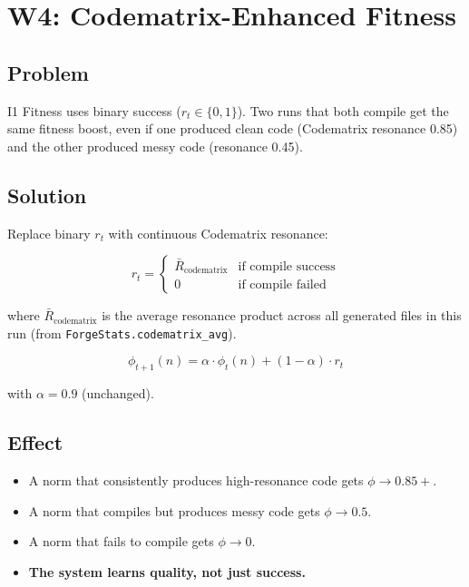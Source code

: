 \documentclass[11pt,a4paper]{article}
\begin{document}
\section{W4: Codematrix-Enhanced Fitness}
\label{sec:w4}

\subsection{Problem}

I1 Fitness uses binary success ($r_t \in \{0, 1\}$). Two runs 
that both compile get the same fitness boost, even if one 
produced clean code (Codematrix resonance 0.85) and the other 
produced messy code (resonance 0.45).

\subsection{Solution}

Replace binary $r_t$ with continuous Codematrix resonance:

\begin{equation}
r_t = \begin{cases}
\bar{R}_\text{codematrix} & \text{if compile success} \\
0 & \text{if compile failed}
\end{cases}
\end{equation}

where $\bar{R}_\text{codematrix}$ is the average resonance 
product across all generated files in this run 
(from \texttt{ForgeStats.codematrix\_avg}).

\begin{equation}
\phi_{t+1}(n) = \alpha \cdot \phi_t(n) + (1 - \alpha) \cdot r_t
\end{equation}

with $\alpha = 0.9$ (unchanged).

\subsection{Effect}

\begin{itemize}[nosep]
\item A norm that consistently produces high-resonance code 
      gets $\phi \to 0.85+$.
\item A norm that compiles but produces messy code gets 
      $\phi \to 0.5$.
\item A norm that fails to compile gets $\phi \to 0$.
\item \textbf{The system learns quality, not just success.}
\end{itemize}
\end{document}
